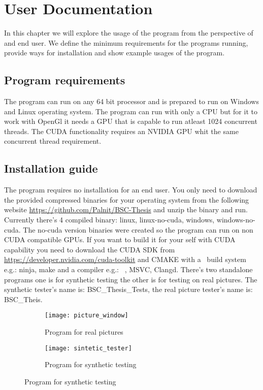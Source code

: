 \chapter{User Documentation}

In this chapter we will explore the usage of the program from the perspective of and end user. We define the minimum requirements for the programs running, provide ways for installation and show example usages of the program.

\section{Program requirements}

The program can run on any 64 bit processor and is prepared to run on Windows and Linux operating system. The program can run with only a \ac{CPU} but for it to work with OpenGl it needs a \ac{GPU} that is capable to run atleast 1024 concurrent threads. The CUDA functionality requires an NVIDIA \ac{GPU} whit the same concurrent thread requirement.

\section{Installation guide}

The program requires no installation for an end user. You only need to download the provided compressed binaries for your operating system from the following website \href{https://github.com/Palnit/BSC-Thesis}{https://github.com/Palnit/BSC-Thesis} and unzip the binary and run. Currently there's 4 compiled binary: linux, linux-no-cuda, windows, windows-no-cuda. The no-cuda version binaries were created so the program can run on non CUDA compatible GPUs. If you want to build it for your self with CUDA capability you need to download the CUDA SDK from \href{https://developer.nvidia.com/cuda-toolkit}{https://developer.nvidia.com/cuda-toolkit} and CMAKE with a \CC\ build system e.g.: ninja, make and a compiler e.g.: \GG\ , MSVC, Clangd. There's two standalone programs one is for synthetic testing the other is for testing on real pictures. The synthetic tester's name is: BSC\_Thesis\_Tests, the real picture tester's name is: BSC\_Theis. 

\begin{figure}[H]
\begin{minipage}{.49\textwidth}
\begin{figure}[H]
\centering
\texttt{[image: picture\_window]}
\caption{Program for real pictures}
\label{fig:noraml_prog}
\end{figure}
\end{minipage}
\begin{minipage}{.49\textwidth}
\begin{figure}[H]
\centering
\texttt{[image: sintetic\_tester]}
\caption{Program for synthetic testing}
\label{fig:test_prog}
\end{figure}
\end{minipage}
\end{figure}

